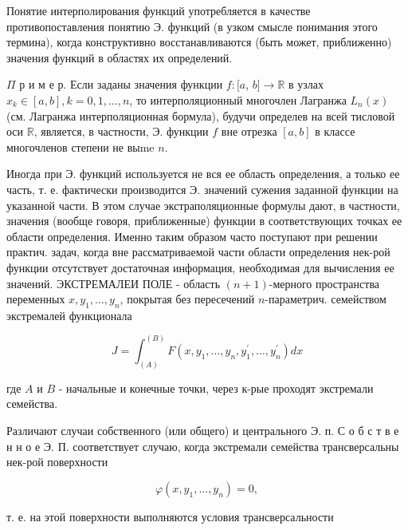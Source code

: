 \documentclass[10pt]{article}
\begin{document}
Понятие интерполирования функций употребляется в качестве противопоставления понятию Э. функций (в узком смысле понимания этого термина), когда конструктивно восстанавливаются (быть может, приближенно) значения функций в областях их определений.



$\Pi$ р и м е р. Если заданы значения функции $f:[a$, $b] \rightarrow \mathbb{R}$ в узлах $x_{k} \in[a, b], k=0,1, \ldots, n$, то интерполяционный многочлен Лагранжа $L_{n}(x)$ (см. Лагранжа интерполяционная бормула), будучи определев на всей тисловой оси $\mathbb{R}$, является, в частности, Э. функции $f$ вне отрезка $[a, b]$ в классе многочленов степени не выme $n$.



Иногда при Э. функций используется не вся ее область определения, а только ее часть, т. е. фактически производится Э. значений сужения заданной функции на указанной части. В этом случае экстраполяционные формулы дают, в частности, значения (вообще говоря, приближенные) функции в соответствующих точках ее области определения. Именно таким образом часто поступают при решении практич. задач, когда вне рассматриваемой части области определения нек-рой функции отсутствует достаточная информация, необходимая для вычисления ее значений. ЭКСТРЕМАЛЕИ ПОЛЕ - область $(n+1)$-мерного пространства переменных $x, y_{1}, \ldots, y_{n}$, покрытая без пересечений $n$-параметрич. семейством экстремалей функционала



\[

J=\int_{(A)}^{(B)} F\left(x, y_{1}, \ldots, y_{n}, y_{1}^{\prime}, \ldots, y_{n}^{\prime}\right) d x

\]



где $A$ и $B$ - начальные и конечные точки, через к-рые проходят экстремали семейства.



Различают случаи собственного (или общего) и центрального Э. п. С о б с т в е н н о е Э. П. соответствует случаю, когда экстремали семейства трансверсальны нек-рой поверхности



\[

\varphi\left(x, y_{1}, \ldots, y_{n}\right)=0,

\]



т. е. на этой поверхности выполняются условия трансверсальности
\end{document}
